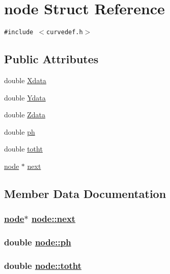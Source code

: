 \hypertarget{structnode}{
\section{node Struct Reference}
\label{structnode}
}
{\tt \#include $<$curvedef.h$>$}

\subsection*{Public Attributes}
\begin{CompactItemize}
\item 
double \hyperlink{structnode_o0}{Xdata}
\item 
double \hyperlink{structnode_o1}{Ydata}
\item 
double \hyperlink{structnode_o2}{Zdata}
\item 
double \hyperlink{structnode_o3}{ph}
\item 
double \hyperlink{structnode_o4}{totht}
\item 
\hyperlink{structnode}{node} $\ast$ \hyperlink{structnode_o5}{next}
\end{CompactItemize}


\subsection{Member Data Documentation}
\hypertarget{structnode_o5}{
\subsubsection[next]{\setlength{\rightskip}{0pt plus 5cm}\hyperlink{structnode}{node}$\ast$ \hyperlink{structnode_o5}{node::next}}}
\label{structnode_o5}


\hypertarget{structnode_o3}{
\subsubsection[ph]{\setlength{\rightskip}{0pt plus 5cm}double \hyperlink{structnode_o3}{node::ph}}}
\label{structnode_o3}


\hypertarget{structnode_o4}{
\subsubsection[totht]{\setlength{\rightskip}{0pt plus 5cm}double \hyperlink{structnode_o4}{node::totht}}}
\label{structnode_o4}


